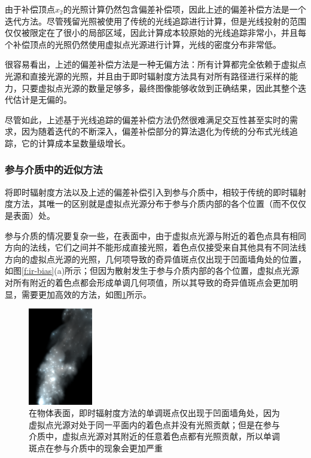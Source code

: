 由于补偿顶点$x_2$的光照计算仍然包含偏差补偿项，因此上述的偏差补偿方法是一个迭代方法。尽管残留光照被使用了传统的光线追踪进行计算，但是光线投射的范围仅仅被限定在了很小的局部区域，因此计算成本较原始的光线追踪非常小，并且每个补偿顶点的光照仍然使用虚拟点光源进行计算，光线的密度分布非常低。

很容易看出，上述的偏差补偿方法是一种无偏方法：所有计算都完全依赖于虚拟点光源和直接光源的光照，并且由于即时辐射度方法具有对所有路径进行采样的能力，只要虚拟点光源的数量足够多，最终图像能够收敛到正确结果，因此其整个迭代估计是无偏的。

尽管如此，上述基于光线追踪的偏差补偿方法仍然很难满足交互性甚至实时的需求，因为随着迭代的不断深入，偏差补偿部分的算法退化为传统的分布式光线追踪，它的计算成本呈数量级增长。



\subsubsection{参与介质中的近似方法}
\cite{a:UnbiasedGlobalIlluminationwithParticipatingMedia}将即时辐射度方法以及上述的偏差补偿引入到参与介质中，相较于传统的即时辐射度方法，其唯一的区别就是虚拟点光源分布于参与介质内部的各个位置（而不仅仅是表面）处。

参与介质的情况要复杂一些，在表面中，由于虚拟点光源与附近的着色点具有相同方向的法线，它们之间并不能形成直接光照，着色点仅接受来自其他具有不同法线方向的虚拟点光源的光照，几何项导致的奇异值斑点仅出现于凹面墙角处的位置，如图\ref{f:ir-bias}(a)所示；但因为散射发生于参与介质内部的各个位置，虚拟点光源对所有附近的着色点都会形成单调几何项值，所以其导致的奇异值斑点会更加明显，需要更加高效的方法，如图\ref{f:ir-unbounded-media}所示。

\begin{figure}
	\sidecaption
	\includegraphics[width=0.25\textwidth]{figures/ir/unbounded-media}
	\caption{在物体表面，即时辐射度方法的单调斑点仅出现于凹面墙角处，因为虚拟点光源对处于同一平面内的着色点并没有光照贡献；但是在参与介质中，虚拟点光源对其附近的任意着色点都有光照贡献，所以单调斑点在参与介质中的现象会更加严重}
	\label{f:ir-unbounded-media}
\end{figure}

